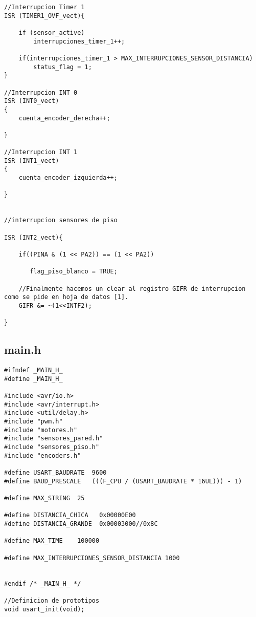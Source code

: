 \documentclass[a4paper,12pt]{article}   %
\begin{document}
\begin{lstlisting}
//Interrupcion Timer 1
ISR (TIMER1_OVF_vect){

    if (sensor_active)
        interrupciones_timer_1++;

	if(interrupciones_timer_1 > MAX_INTERRUPCIONES_SENSOR_DISTANCIA)
        status_flag = 1;
}

//Interrupcion INT 0
ISR (INT0_vect)
{
    cuenta_encoder_derecha++;

}

//Interrupcion INT 1
ISR (INT1_vect)
{
    cuenta_encoder_izquierda++;

}


//interrupcion sensores de piso

ISR (INT2_vect){

    if((PINA & (1 << PA2)) == (1 << PA2))

       flag_piso_blanco = TRUE;

    //Finalmente hacemos un clear al registro GIFR de interrupcion como se pide en hoja de datos [1].
    GIFR &= ~(1<<INTF2);

}

\end{lstlisting}
 
\subsection{main.h}

\begin{lstlisting}
#ifndef _MAIN_H_
#define _MAIN_H_

#include <avr/io.h>
#include <avr/interrupt.h>
#include <util/delay.h>
#include "pwm.h"
#include "motores.h"
#include "sensores_pared.h"
#include "sensores_piso.h"
#include "encoders.h"

#define USART_BAUDRATE 	9600
#define BAUD_PRESCALE 	(((F_CPU / (USART_BAUDRATE * 16UL))) - 1)

#define MAX_STRING	25

#define DISTANCIA_CHICA   0x00000E00
#define DISTANCIA_GRANDE  0x00003000//0x8C

#define MAX_TIME    100000

#define MAX_INTERRUPCIONES_SENSOR_DISTANCIA 1000


#endif /* _MAIN_H_ */

//Definicion de prototipos
void usart_init(void);
\end{lstlisting}
\end{document}
